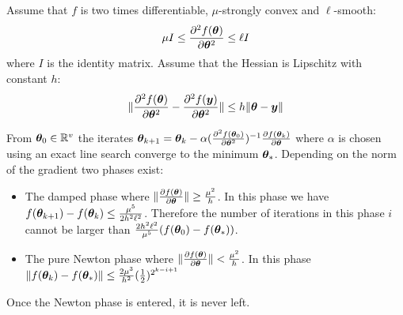 \begin{proposition}
  \label{eq:conv:newton}
  Assume that $f$ is two times differentiable, $\mu$-strongly convex and $\ell$-smooth:
  \begin{equation}
    \mu I \leq \partialfrac{\thetab^2}{^2 f(\thetab)} \leq \ell I
  \end{equation}
  where $I$ is the identity matrix.
  Assume that the Hessian is Lipschitz with constant $h$:
  \begin{equation}
  \| \partialfrac{\thetab^2}{^2 f(\thetab)} - \partialfrac{\thetab^2}{^2 f(\yb)} \| \leq h \| \thetab
  - \yb \|
 \end{equation}

  From $\thetab_0 \in \RR^v$  the iterates
  $\thetab_{k+1} = \thetab_k -\alpha (\partialfrac{\thetab^2}{^2 f(\thetab_0)})^{-1}
  \partialfrac{\thetab}{f(\thetab_k)}$ where $\alpha$ is chosen using an exact line
  search converge to the
  minimum $\thetab_*$.
  Depending on the norm of the gradient two phases exist:
  \begin{itemize}
  \item The damped phase where $\| \partialfrac{\thetab}{f(\thetab)} \| \geq \frac{\mu^2}{h}$.
    In this phase we have $f(\thetab_{k+1}) - f(\thetab_k) \leq \frac{\mu^5}{2h^2 \ell^2}$.
    Therefore the number of iterations in this phase $i$ cannot be larger than
    $\frac{2 h^2 \ell^2}{\mu^5}(f(\thetab_0) - f(\thetab_*))$.
  \item The pure Newton phase where $\| \partialfrac{\thetab}{f(\thetab)} \| < \frac{\mu^2}{h}$.
      In this phase $\|f(\thetab_{k}) - f(\thetab_*)\| \leq \frac{2 \mu^3}{h^2}
      (\frac12)^{2^{k -i +1}}$
 \end{itemize}
 Once the Newton phase is entered, it is never left.
\end{proposition}
